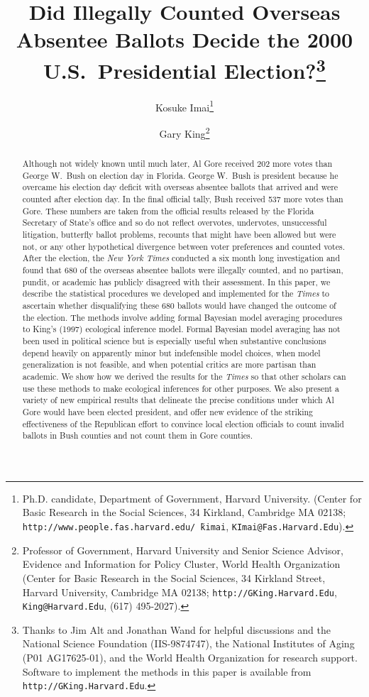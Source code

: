 \documentclass[11pt,titlepage]{article}
\title{Did Illegally Counted Overseas Absentee Ballots Decide the 2000
  U.S.\ Presidential Election?\thanks{Thanks to Jim Alt and Jonathan
    Wand for helpful discussions and the National Science Foundation
    (IIS-9874747), the National Institutes of Aging (P01 AG17625-01),
    and the World Health Organization for research support.  Software
    to implement the methods in this paper is available from
    \texttt{http://GKing.Harvard.Edu}.}}
\author{Kosuke Imai\thanks{Ph.D. candidate, Department of Government,
    Harvard University. (Center for Basic Research in the Social
    Sciences, 34 Kirkland, Cambridge MA 02138;
    \texttt{http://www.people.fas.harvard.edu/\~\,kimai},
    \texttt{KImai@Fas.Harvard.Edu}).}
\and %
Gary King\thanks{Professor of Government, Harvard University and
  Senior Science Advisor, Evidence and Information for Policy Cluster,
  World Health Organization (Center for Basic Research in the Social
  Sciences, 34 Kirkland Street, Harvard University, Cambridge MA
  02138; \texttt{http://GKing.Harvard.Edu}, \texttt{King@Harvard.Edu},
  (617) 495-2027).}  
}
\begin{document}
\maketitle

\begin{abstract}
  Although not widely known until much later, Al Gore received 202
  more votes than George W.\ Bush on election day in Florida.  George
  W.\ Bush is president because he overcame his election day deficit
  with overseas absentee ballots that arrived and were counted after
  election day.  In the final official tally, Bush received 537 more
  votes than Gore.  These numbers are taken from the official results
  released by the Florida Secretary of State's office and so do not
  reflect overvotes, undervotes, unsuccessful litigation, butterfly
  ballot problems, recounts that might have been allowed but were not,
  or any other hypothetical divergence between voter preferences and
  counted votes.  After the election, the \emph{New York Times}
  conducted a six month long investigation and found that 680 of the
  overseas absentee ballots were illegally counted, and no partisan,
  pundit, or academic has publicly disagreed with their assessment.
  In this paper, we describe the statistical procedures we developed
  and implemented for the \emph{Times} to ascertain whether
  disqualifying these 680 ballots would have changed the outcome of
  the election.  The methods involve adding formal Bayesian model
  averaging procedures to King's (1997) ecological inference model.
  Formal Bayesian model averaging has not been used in political
  science but is especially useful when substantive conclusions depend
  heavily on apparently minor but indefensible model choices, when
  model generalization is not feasible, and when potential critics are
  more partisan than academic.  We show how we derived the results for
  the \emph{Times} so that other scholars can use these methods to
  make ecological inferences for other purposes.  We also present a
  variety of new empirical results that delineate the precise
  conditions under which Al Gore would have been elected president,
  and offer new evidence of the striking effectiveness of the
  Republican effort to convince local election officials to count
  invalid ballots in Bush counties and not count them in Gore
  counties.
\end{abstract}

\end{document}
